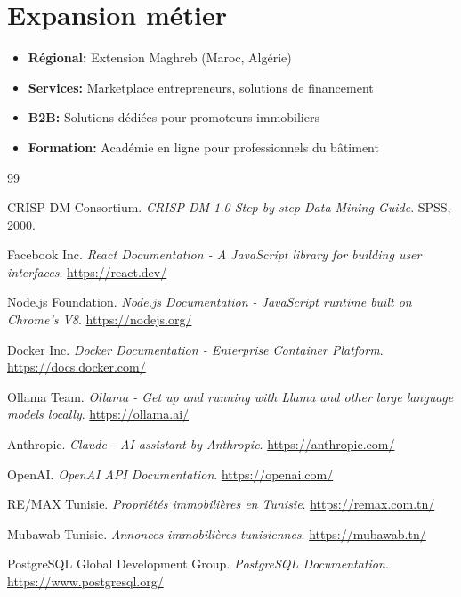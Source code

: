 \documentclass[12pt,a4paper]{report}
\begin{document}
\section*{Expansion métier}

\begin{itemize}
    \item \textbf{Régional:} Extension Maghreb (Maroc, Algérie)
    \item \textbf{Services:} Marketplace entrepreneurs, solutions de financement
    \item \textbf{B2B:} Solutions dédiées pour promoteurs immobiliers
    \item \textbf{Formation:} Académie en ligne pour professionnels du bâtiment
\end{itemize}

\begin{thebibliography}{99}

CRISP-DM Consortium. 
\textit{CRISP-DM 1.0 Step-by-step Data Mining Guide}. 
SPSS, 2000.

Facebook Inc.
\textit{React Documentation - A JavaScript library for building user interfaces}.
\url{https://react.dev/}

Node.js Foundation.
\textit{Node.js Documentation - JavaScript runtime built on Chrome's V8}.
\url{https://nodejs.org/}

Docker Inc.
\textit{Docker Documentation - Enterprise Container Platform}.
\url{https://docs.docker.com/}

Ollama Team.
\textit{Ollama - Get up and running with Llama and other large language models locally}.
\url{https://ollama.ai/}

Anthropic.
\textit{Claude - AI assistant by Anthropic}.
\url{https://anthropic.com/}

OpenAI.
\textit{OpenAI API Documentation}.
\url{https://openai.com/}

RE/MAX Tunisie.
\textit{Propriétés immobilières en Tunisie}.
\url{https://remax.com.tn/}

Mubawab Tunisie.
\textit{Annonces immobilières tunisiennes}.
\url{https://mubawab.tn/}

PostgreSQL Global Development Group.
\textit{PostgreSQL Documentation}.
\url{https://www.postgresql.org/}

\end{thebibliography}
\end{document}
